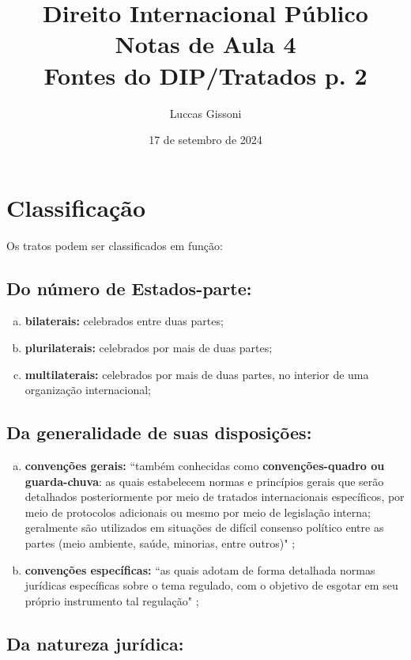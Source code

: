 \documentclass{article}
\title{%
  Direito Internacional Público \\
  \Large Notas de Aula 4\\
  \Large Fontes do DIP/Tratados p. 2\\
  }
\author{Luccas Gissoni}
\date{17 de setembro de 2024}
\begin{document}
\maketitle


\tableofcontents

\section{Classificação}

Os tratos podem ser classificados em função:

\subsection{Do número de Estados-parte:}

\begin{enumerate}[(a)]
    \item \textbf{bilaterais:} celebrados entre duas partes;
    \item \textbf{plurilaterais:} celebrados por mais de duas partes;
    \item \textbf{multilaterais:}  celebrados por mais de duas partes, no interior de uma organização internacional;
\end{enumerate}

\subsection{Da generalidade de suas disposições:}

\begin{enumerate}[(a)]
    \item \textbf{convenções gerais:} ``também conhecidas como \textbf{convenções-quadro ou guarda-chuva}: as quais estabelecem normas e princípios gerais que serão detalhados posteriormente por meio de tratados internacionais específicos, por meio de protocolos adicionais ou mesmo por meio de legislação interna; geralmente são utilizados em situações de difícil consenso político entre as partes (meio ambiente, saúde, minorias, entre outros)" \cite[p.~153]{accioly_manual_2023};
    \item \textbf{convenções específicas:} ``as quais adotam de forma detalhada normas jurídicas específicas sobre o tema regulado, com o objetivo de esgotar em seu próprio instrumento tal regulação" \cite[p.~153]{accioly_manual_2023};
\end{enumerate}

\subsection{Da natureza jurídica:}
\end{document}
